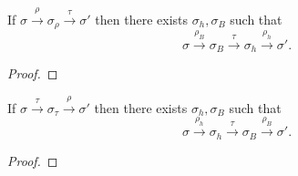 \documentclass[11pt]{article}
\begin{document}
\begin{lemma}
	\label{lem:rho-tau-commute}
	If $\sigma \stackrel{\rho}{\rightarrow} \sigma_\rho \stackrel{\tau}{\rightarrow} \sigma'$ then there exists $\sigma_h,\sigma_B$ such that \[ \sigma \stackrel{\rho_B}{\rightarrow} \sigma_B \stackrel{\tau}{\rightarrow} \sigma_h \stackrel{\rho_h}{\rightarrow} \sigma'.\] 
\end{lemma}

\begin{proof}
\end{proof}

\begin{lemma}
	\label{lem:tau-rho-commute}
	If $\sigma \stackrel{\tau}{\rightarrow} \sigma_\tau \stackrel{\rho}{\rightarrow} \sigma'$ then there exists $\sigma_h,\sigma_B$ such that \[ \sigma \stackrel{\rho_h}{\rightarrow} \sigma_h \stackrel{\tau}{\rightarrow} \sigma_B \stackrel{\rho_B}{\rightarrow} \sigma'.\] 
\end{lemma}

\begin{proof}
\end{proof}
\end{document}
